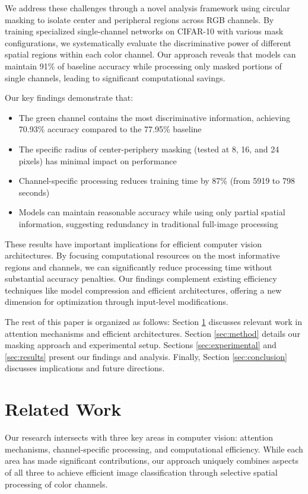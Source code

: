\documentclass{article} %
\begin{document}
We address these challenges through a novel analysis framework using circular masking to isolate center and peripheral regions across RGB channels. By training specialized single-channel networks on CIFAR-10 with various mask configurations, we systematically evaluate the discriminative power of different spatial regions within each color channel. Our approach reveals that models can maintain 91\% of baseline accuracy while processing only masked portions of single channels, leading to significant computational savings.

Our key findings demonstrate that:
\begin{itemize}
    \item The green channel contains the most discriminative information, achieving 70.93\% accuracy compared to the 77.95\% baseline
    \item The specific radius of center-periphery masking (tested at 8, 16, and 24 pixels) has minimal impact on performance
    \item Channel-specific processing reduces training time by 87\% (from 5919 to 798 seconds)
    \item Models can maintain reasonable accuracy while using only partial spatial information, suggesting redundancy in traditional full-image processing
\end{itemize}

These results have important implications for efficient computer vision architectures. By focusing computational resources on the most informative regions and channels, we can significantly reduce processing time without substantial accuracy penalties. Our findings complement existing efficiency techniques like model compression and efficient architectures, offering a new dimension for optimization through input-level modifications.

The rest of this paper is organized as follows: Section \ref{sec:related} discusses relevant work in attention mechanisms and efficient architectures. Section \ref{sec:method} details our masking approach and experimental setup. Sections \ref{sec:experimental} and \ref{sec:results} present our findings and analysis. Finally, Section \ref{sec:conclusion} discusses implications and future directions.

\section{Related Work}
\label{sec:related}

Our research intersects with three key areas in computer vision: attention mechanisms, channel-specific processing, and computational efficiency. While each area has made significant contributions, our approach uniquely combines aspects of all three to achieve efficient image classification through selective spatial processing of color channels.
\end{document}
